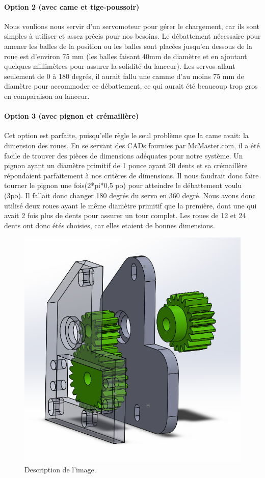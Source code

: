 \paragraph{Option 2 (avec came et tige-poussoir)}
Nous voulions nous servir d’un servomoteur pour gérer le chargement, car ils sont simples à utiliser et assez précis pour nos besoins.
Le débattement nécessaire pour amener les balles de la position ou les balles sont placées jusqu’en dessous de la roue est d’environ 75 mm (les balles faisant 40mm de diamètre et en ajoutant quelques millimètres pour assurer la solidité du lanceur).
Les servos allant seulement de 0 à 180 degrés, il aurait fallu une camme d’au moins 75 mm de diamètre pour accommoder ce débattement, ce qui aurait été beaucoup trop gros en comparaison au lanceur.

\paragraph{Option 3 (avec pignon et crémaillère)}
Cet option est parfaite, puisqu’elle règle le seul problème que la came avait: la dimension des roues.
En se servant des CADs fournies par McMaster.com, il a été facile de trouver des pièces de dimensions adéquates pour notre système.
Un pignon ayant un diamètre primitif de 1 pouce ayant 20 dents et sa crémaillère répondaient parfaitement à nos critères de dimensions.
Il nous faudrait donc faire tourner le pignon une fois(2*pi*0,5 po) pour atteindre le débattement voulu (3po).
Il fallait donc changer 180 degrés du servo en 360 degré.
Nous avons donc utilisé deux roues ayant le même diamètre primitif que la première, dont une qui avait 2 fois plus de dents pour assurer un tour complet.
Les roues de 12 et 24 dents ont donc étés choisies, car elles etaient de bonnes dimensions.

\begin{figure}[h!]
    \centering
    \includegraphics[width=0.5\linewidth]{img/s2/cad/gearbox1}
    \caption{Description de l'image.}
    \label{fig:s2-cad-gearbox1}
\end{figure}

